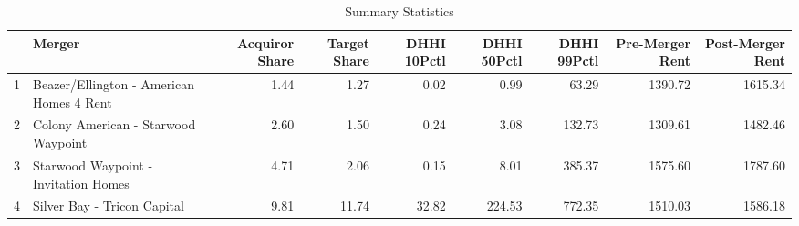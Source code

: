 \begin{table}[ht]
\centering
\begin{tabular}{rlrrrrrrr}
  \hline
 & Merger & Acquiror Share & Target Share & DHHI 10Pctl & DHHI 50Pctl & DHHI 99Pctl & Pre-Merger Rent & Post-Merger Rent \\ 
  \hline
1 & Beazer/Ellington - American Homes 4 Rent & 1.44 & 1.27 & 0.02 & 0.99 & 63.29 & 1390.72 & 1615.34 \\ 
  2 & Colony American - Starwood Waypoint & 2.60 & 1.50 & 0.24 & 3.08 & 132.73 & 1309.61 & 1482.46 \\ 
  3 & Starwood Waypoint - Invitation Homes & 4.71 & 2.06 & 0.15 & 8.01 & 385.37 & 1575.60 & 1787.60 \\ 
  4 & Silver Bay - Tricon Capital & 9.81 & 11.74 & 32.82 & 224.53 & 772.35 & 1510.03 & 1586.18 \\ 
   \hline
\end{tabular}
\caption{Summary Statistics} 
\end{table}
